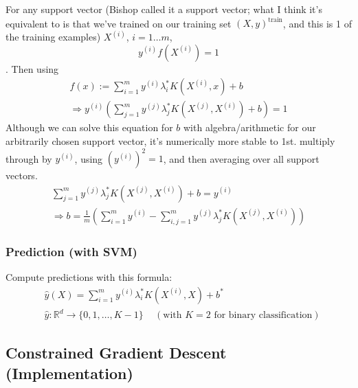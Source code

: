 \documentclass[10pt]{amsart}
\begin{document}
\begin{multicols*}{2}
For any support vector (Bishop called it a support vector; what I think it's equivalent to is that we've trained on our training set $(X,y)^{\text{train}}$, and this is 1 of the training examples) $X^{(i)}$, $i=1\dots m$,
\begin{equation}
  y^{(i)}f(X^{(i)}) =1
  \end{equation}.  Then using
\begin{equation}
\begin{gathered}
  f(x):=\sum_{i=1}^m y^{(i)} \lambda_i^* K(X^{(i)},x) + b \\
  \Longrightarrow y^{(i)} \left( \sum_{j=1}^m y^{(j)} \lambda_j^* K(X^{(j)},X^{(i)} ) + b \right) = 1
  \end{gathered}
  \end{equation}
Although we can solve this equation for $b$ with algebra/arithmetic for our arbitrarily chosen support vector, it's numerically more stable to 1st. multiply through by $y^{(i)}$, using $(y^{(i)})^2 =1$, and then averaging over all support vectors.
\begin{equation}\label{Eq:bintercept}
  \begin{gathered}
    \sum_{j=1}^m y^{(j)}\lambda_j^* K(X^{(j)},X^{(i)}) +b = y^{(i)} \\
    \Longrightarrow b= \frac{1}{m} \left( \sum_{i=1}^m y^{(i)} - \sum_{i,j=1}^m y^{(j)} \lambda_j^* K(X^{(j)}, X^{(i)}) \right)
    \end{gathered}
  \end{equation}

\subsubsection{Prediction (with SVM)} \label{SubSec:Predictioncompute}
Compute predictions with this formula: \cite{CFZ2009}
\begin{equation}\label{Eq:predictyhat}
  \begin{aligned}
    & \widehat{y}(X) = \sum_{i=1}^m y^{(i)} \lambda_i^* K(X^{(i)}, X) + b^* \\ 
    & \widehat{y}:\mathbb{R}^d \to \lbrace 0 ,1 , \dots , K-1 \rbrace \quad \, (\text{with $K=2$ for binary classification})
    \end{aligned}
  \end{equation}





\subsection{Constrained Gradient Descent (Implementation)}\label{Sec:ConstrainedGradDescImplementation}


\end{multicols*}
\end{document}

